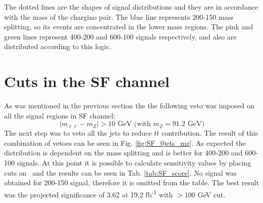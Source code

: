 The dotted lines are the shapes of signal distributions and they are in accordance with the mass of the chargino pair. The blue line represents 200-150 mass splitting, so its events are concentrated in the lower mass regions. The pink and green lines represent 400-200 and 600-100 signals respectively, and also are distributed according to this logic. 

\section{Cuts in the SF channel}

As was mentioned in the previous section the the following veto was imposed on all the signal regions in SF channel:
\begin{equation*}
|m_{\ell \ell} - m_Z| > 10 \text{ GeV (with } m_Z = 91.2 \text{ GeV}) 
\end{equation*}
The next step was to veto all the jets to reduce $t\bar{t}$ contribution. The result of this combination of vetoes can be seen in Fig. \ref{fig:SF_0jets_mz}. As expected the \mttwo \, distribution is dependent on the mass splitting and is better for 400-200 and 600-100 signals. At this point it is possible to calculate sensitivity values by placing cuts on \mttwo \, and the results can be seen in Tab. \ref{tab:SF_score}. No signal was obtained for 200-150 signal, therefore it is omitted from the table. The best result was the projected significance of 3.62 at 19.2 fb\textsuperscript{-1}  with \mttwo$>100$ GeV cut. 



